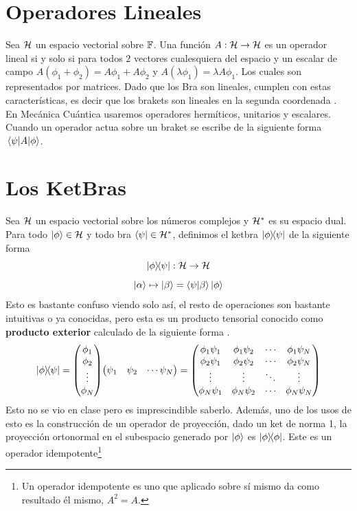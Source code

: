 \section{Operadores Lineales}
Sea $\mathcal{H}$ un espacio vectorial sobre $\mathbb{F}$. Una función $A:\mathcal{H} \to \mathcal{H}$ es un operador lineal si y solo si para todos $2$ vectores cualesquiera del espacio y un escalar de campo $A(\phi _1 + \phi _2) = A\phi_1 + A\phi _2$ y $A(\lambda \phi _1) = \lambda A \phi_1$. Los cuales son representados por matrices. Dado que los Bra son lineales, cumplen con estas características, es decir que los brakets son lineales en la segunda coordenada . En Mecánica Cuántica usaremos operadores hermíticos, unitarios y escalares. Cuando un operador actua sobre un braket se escribe de la siguiente forma $\mel{\psi}{A}{\phi}$.


\section{Los KetBras}
Sea $\mathcal{H}$ un espacio vectorial sobre los números complejos y $\mathcal{H} ^*$ es su espacio dual. Para todo $\ket{\phi} \in \mathcal{H}$ y todo bra $\bra{\psi} \in \mathcal{H} ^*$, definimos el ketbra $\ketbra{\phi}{\psi}$ de la siguiente forma
	$$ \ketbra{\phi}{\psi}:\mathcal{H} \to \mathcal{H} $$
	$$ \ket{\alpha} \mapsto \ket{\beta} = \braket{\psi}{\beta} \ket{\phi} $$
Esto es bastante confuso viendo solo así, el resto de operaciones son bastante intuitivas o ya conocidas, pero esta es un producto tensorial conocido como \textbf{producto exterior} calculado de la siguiente forma .
	$$ \ketbra{\phi}{\psi} = \mqty(\phi_1 \\ \phi_2 \\ \vdots \\ \phi _N) \mqty(\psi _1 & \psi _2 & \cdots \psi _N) = \mqty( \phi _1 \psi_1 & \phi _1 \psi_2 & \cdots & \phi _1 \psi _N \\
						 \phi _2 \psi_1 & \phi _2 \psi_2 & \cdots & \phi _2 \psi _N \\
						 \vdots & \vdots &\ddots & \vdots \\
						 \phi _N \psi_1 & \phi _N \psi_2 & \cdots & \phi _N \psi _N \\ ) $$
Esto no se vio en clase pero es imprescindible saberlo. Además, uno de los usos de esto es la construcción de un operador de proyección, dado un ket de norma 1, la proyección ortonormal en el subespacio generado por $\ket{\phi}$ es $\ketbra{\phi}$. Este es un operador idempotente\footnote{Un operador idempotente es uno que aplicado sobre sí mismo da como resultado él mismo, $A^2 = A$.} \\

